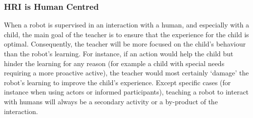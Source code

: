 
\subsubsection{HRI is Human Centred}

When a robot is supervised in an interaction with a human, and especially with a child, the main goal of the teacher is to ensure that the experience for the child is optimal. Consequently, the teacher will be more focused on the child's behaviour than the robot's learning. For instance, if an action would help the child but hinder the learning for any reason (for example a child with special needs requiring a more proactive active), the teacher would most certainly `damage' the robot's learning to improve the child's experience. Except specific cases (for instance when using actors or informed participants), teaching a robot to interact with humans will always be a secondary activity or a by-product of the interaction. 

